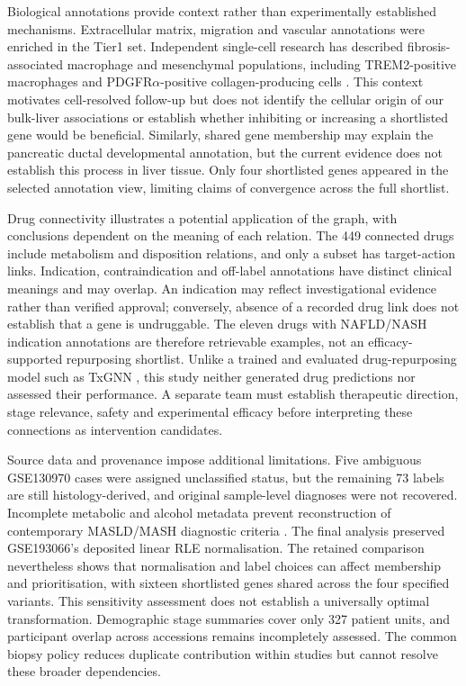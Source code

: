 \documentclass[11pt,a4paper]{article}
\begin{document}
Biological annotations provide context rather than experimentally established mechanisms. Extracellular matrix, migration and vascular annotations were enriched in the Tier1 set. Independent single-cell research has described fibrosis-associated macrophage and mesenchymal populations, including TREM2-positive macrophages and PDGFR\ensuremath{\alpha}-positive collagen-producing cells \cite{ref7}. This context motivates cell-resolved follow-up but does not identify the cellular origin of our bulk-liver associations or establish whether inhibiting or increasing a shortlisted gene would be beneficial. Similarly, shared gene membership may explain the pancreatic ductal developmental annotation, but the current evidence does not establish this process in liver tissue. Only four shortlisted genes appeared in the selected annotation view, limiting claims of convergence across the full shortlist.

Drug connectivity illustrates a potential application of the graph, with conclusions dependent on the meaning of each relation. The 449 connected drugs include metabolism and disposition relations, and only a subset has target-action links. Indication, contraindication and off-label annotations have distinct clinical meanings and may overlap. An indication may reflect investigational evidence rather than verified approval; conversely, absence of a recorded drug link does not establish that a gene is undruggable. The eleven drugs with NAFLD/NASH indication annotations are therefore retrievable examples, not an efficacy-supported repurposing shortlist. Unlike a trained and evaluated drug-repurposing model such as TxGNN \cite{ref6}, this study neither generated drug predictions nor assessed their performance. A separate team must establish therapeutic direction, stage relevance, safety and experimental efficacy before interpreting these connections as intervention candidates.

Source data and provenance impose additional limitations. Five ambiguous GSE130970 cases were assigned unclassified status, but the remaining 73 labels are still histology-derived, and original sample-level diagnoses were not recovered. Incomplete metabolic and alcohol metadata prevent reconstruction of contemporary MASLD/MASH diagnostic criteria \cite{ref3}. The final analysis preserved GSE193066's deposited linear RLE normalisation. The retained comparison nevertheless shows that normalisation and label choices can affect membership and prioritisation, with sixteen shortlisted genes shared across the four specified variants. This sensitivity assessment does not establish a universally optimal transformation. Demographic stage summaries cover only 327 patient units, and participant overlap across accessions remains incompletely assessed. The common biopsy policy reduces duplicate contribution within studies but cannot resolve these broader dependencies.
\end{document}
